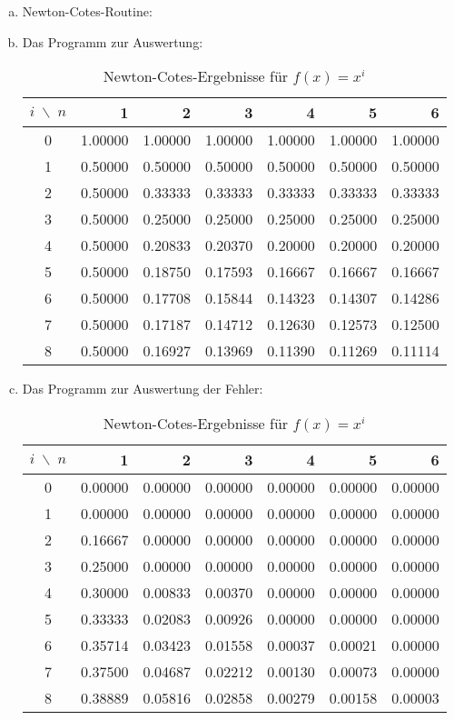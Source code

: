 \documentclass[a4paper]{scrartcl}
\begin{document}
\begin{aufgabe}
	\begin{enumerate}[a)]
		\item
			Newton-Cotes-Routine:
			
		\item
			Das Programm zur Auswertung:
			
			\begin{table}[h]
				\centering
				\caption{Newton-Cotes-Ergebnisse für $f(x)=x^i$}
				\begin{tabular}{c|rrrrrr}
					$i \;\backslash\; n$ & 1 & 2 & 3 & 4 & 5 & 6 \\ \hline
0 &  1.00000 & 1.00000 & 1.00000 & 1.00000 & 1.00000 & 1.00000 \\
1 &  0.50000 & 0.50000 & 0.50000 & 0.50000 & 0.50000 & 0.50000\\
2 &  0.50000 & 0.33333 & 0.33333 & 0.33333 & 0.33333 & 0.33333\\
3 &  0.50000 & 0.25000 & 0.25000 & 0.25000 & 0.25000 & 0.25000\\
4 &  0.50000 & 0.20833 & 0.20370 & 0.20000 & 0.20000 & 0.20000\\
5 &  0.50000 & 0.18750 & 0.17593 & 0.16667 & 0.16667 & 0.16667\\
6 &  0.50000 & 0.17708 & 0.15844 & 0.14323 & 0.14307 & 0.14286\\
7 &  0.50000 & 0.17187 & 0.14712 & 0.12630 & 0.12573 & 0.12500\\
8 &  0.50000 & 0.16927 & 0.13969 & 0.11390 & 0.11269 & 0.11114\\
				\end{tabular}
			\end{table}
			\newpage
		\item
			Das Programm zur Auswertung der Fehler:
			
			\begin{table}[h]
				\centering
				\caption{Newton-Cotes-Ergebnisse für $f(x)=x^i$}
				\begin{tabular}{c|rrrrrr}
					$i \;\backslash\; n$ & 1 & 2 & 3 & 4 & 5 & 6 \\ \hline
0 &  0.00000 & 0.00000 & 0.00000 & 0.00000 & 0.00000 & 0.00000\\
1 &  0.00000 & 0.00000 & 0.00000 & 0.00000 & 0.00000 & 0.00000\\
2 &  0.16667 & 0.00000 & 0.00000 & 0.00000 & 0.00000 & 0.00000\\
3 &  0.25000 & 0.00000 & 0.00000 & 0.00000 & 0.00000 & 0.00000\\
4 &  0.30000 & 0.00833 & 0.00370 & 0.00000 & 0.00000 & 0.00000\\
5 &  0.33333 & 0.02083 & 0.00926 & 0.00000 & 0.00000 & 0.00000\\
6 &  0.35714 & 0.03423 & 0.01558 & 0.00037 & 0.00021 & 0.00000\\
7 &  0.37500 & 0.04687 & 0.02212 & 0.00130 & 0.00073 & 0.00000\\
8 &  0.38889 & 0.05816 & 0.02858 & 0.00279 & 0.00158 & 0.00003\\
				\end{tabular}
			\end{table}


\end{enumerate}
\end{aufgabe}
\end{document}
